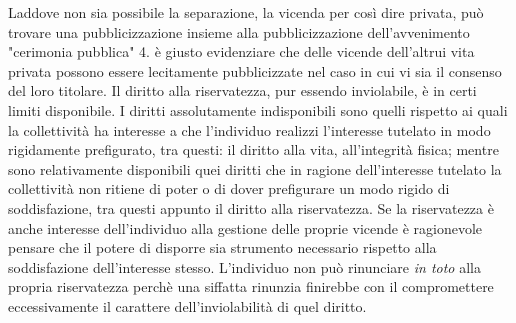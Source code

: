 Laddove non sia possibile la separazione, la vicenda per così dire privata, può trovare una pubblicizzazione insieme alla pubblicizzazione dell'avvenimento "cerimonia pubblica"
4. è giusto evidenziare che delle vicende dell'altrui vita privata possono essere lecitamente pubblicizzate nel caso in cui vi sia il consenso del loro titolare.
Il diritto alla riservatezza, pur essendo inviolabile, è in certi limiti disponibile. I diritti assolutamente indisponibili sono quelli rispetto ai quali la collettività ha interesse a che l'individuo realizzi l'interesse tutelato in modo rigidamente prefigurato, tra questi:
il diritto alla vita, all'integrità fisica; 
mentre sono relativamente disponibili quei diritti che in ragione dell'interesse tutelato la collettività non ritiene di poter o di dover prefigurare un modo rigido di soddisfazione, tra questi appunto il diritto alla riservatezza.
Se la riservatezza è anche interesse dell'individuo alla gestione delle proprie vicende è ragionevole pensare che il potere di disporre sia strumento necessario rispetto alla soddisfazione dell'interesse stesso. L'individuo non può rinunciare \textit{in toto} alla propria riservatezza perchè una siffatta rinunzia finirebbe con il compromettere eccessivamente il carattere dell'inviolabilità di quel diritto.

